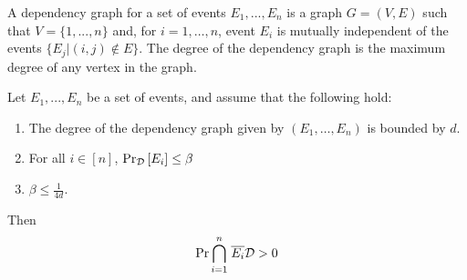 \documentclass[11pt]{article}
\begin{document}
A dependency graph for a set of events $E_1, . . . , E_n$ is a graph $G=(V, E)$ such that $V = \{1,.. . , n\}$ and,  for $i= 1,\dots, n$, event $E_i$ is mutually independent
of the events $\{E_j | (i, j) \notin E\}$. The degree of the dependency graph is the maximum degree of any vertex in the graph.


\begin{lemma}\label{lemma:lll}
Let $E_1,...,E_n$ be a set of events, and assume that the following hold:
\begin{enumerate}
\item The degree of the dependency graph given by $(E_1, \dots, E_n)$ is bounded by $d$.

\item For all $i \in [n]$, $\Pr_{\mathcal{D}}\left[E_i \right] \leq \beta$

\item $\beta \leq \frac{1}{4d}$.
\end{enumerate}
Then
\[ \Pr{\overset{n}{ \underset{i=1}{\bigcap}} \hspace{0.1cm}  \overline{E_i}}{\mathcal{D}} > 0\]


\end{lemma}


\end{document}

